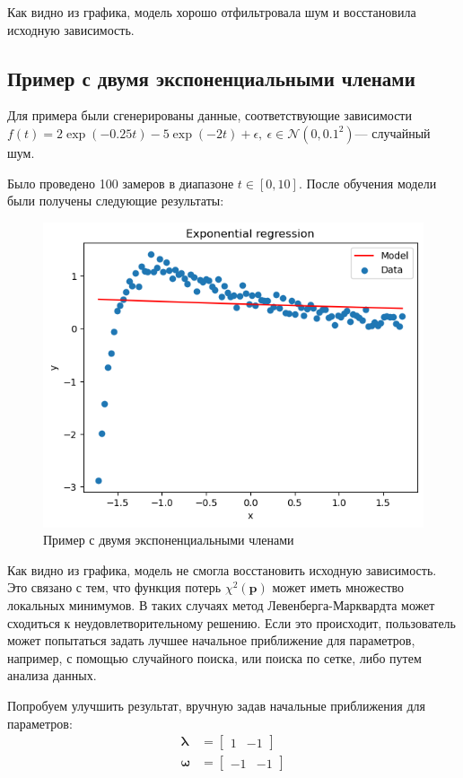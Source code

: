 Как видно из графика, модель хорошо отфильтровала шум и восстановила исходную зависимость.

\subsection{Пример с двумя экспоненциальными членами}

Для примера были сгенерированы данные, соответствующие зависимости $f(t) = 2\exp(-0.25t)-5\exp(-2t)  + \epsilon,\:\epsilon\in\mathcal{N}(0, 0.1^2)$— случайный шум.

Было проведено 100 замеров в диапазоне $t\in[0, 10]$. После обучения модели были получены следующие результаты:

\begin{figure}[h!]
	\centering
	\includegraphics[width=0.7\linewidth]{../img/ex2_poor.png}
	\caption{Пример с двумя экспоненциальными членами}
	\label{fig:image}
\end{figure}

Как видно из графика, модель не смогла восстановить исходную зависимость. Это связано с тем, что функция потерь $\chi^2(\mathbf{p})$ может иметь множество локальных минимумов. В таких случаях метод Левенберга-Марквардта может сходиться к неудовлетворительному решению. Если это происходит, пользователь может попытаться задать лучшее начальное приближение для параметров, например, с помощью случайного поиска, или поиска по сетке, либо путем анализа данных.

Попробуем улучшить результат, вручную задав начальные приближения для параметров:
$$
	\begin{aligned}
		\mathbf{\lambda} & = \begin{bmatrix} 1 & -1 \end{bmatrix}  \\
		\mathbf{\omega}  & = \begin{bmatrix} -1 & -1 \end{bmatrix}
	\end{aligned}
$$


